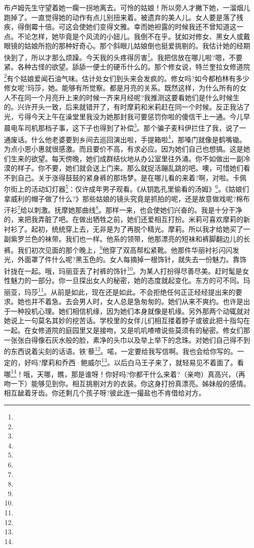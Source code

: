 \par 布卢姆先生守望着她一瘸一拐地离去。可怜的姑娘！所以旁人才撇下她，一溜烟儿跑掉了。一直觉得她的动作有点儿别扭来着。被遗弃的美人儿。女人要是落了残疾，得倒霉十倍。可这会使她们变得文雅。幸而她袒露的时候我还不曾知道这一点。不论怎样，她毕竟是个风流的小妞儿。我倒不在乎。犹如对修女、黑女人或戴眼镜的姑娘所抱的那种好奇心。那个斜眼儿姑娘倒也挺爱挑剔的。我估计她的经期快到了，所以才那么烦躁。今天我的头疼得厉害\footnote{}。我把信放在哪儿啦?嗯，不要紧。各种古怪的欲望。舔舔一便士的硬币什么的。那个修女说，特兰奎拉女修道院\footnote{}有个姑娘爱闻石油气味。估计处女们到头来会发疯的。修女吗?如今都柏林有多少修女呢?玛莎，她。能够有所觉察。都是月亮的关系。既然这样，为什么所有的女人不在同一个月亮升上来的时候一齐来月经呢?我推测这要看她们是什么时候生的。兴许开头一致，后来就错开了，有时摩莉和米莉赶在同一个时候。反正我沾了光，亏得今天上午在澡堂里我没为她那封我可要惩罚你啦的傻信干上一通。今儿早晨电车司机那档子事，这下子也得到了补偿\footnote{}。那个骗子麦科伊拦住了我，说了一通废话。什么他老婆要到乡间去巡回演出啦，手提箱啦\footnote{}，那嗓门就像是鹤嘴锄。为点小恩小惠就很感激。而且要价不高，有求必应。因为她们自己也想搞。这是她们生来的欲望。每天傍晚，她们成群结伙地从办公室里往外涌。你不如做出一副冷漠的样子。你不要，她们就会送上门来。那么就捉活蹦乱跳的吧。噢，可惜她们看不到自己。关于涨得鼓鼓的紧身裤的那场梦。是在哪儿看的来着?啊，对啦。卡佩尔街上的活动幻灯器\footnote{}：仅许成年男子观看。《从钥匙孔里偷看的汤姆》\footnote{}。《姑娘们拿威利的帽子做了什么?》那些姑娘的镜头究竟是抓拍的呢，还是故意做戏呢?棉布汗衫\footnote{}给以刺激。抚摩她那曲线\footnote{}。那样一来，也会使她们兴奋的。我是十分干净的，来把我弄脏了吧。在做出牺牲之前，她们还爱相互打扮。米莉可喜欢摩莉的新衬衫了。起初，统统穿上去，无非是为了再脱个精光。摩莉。所以我才给她买了一副紫罗兰色的袜带。我们也一样。他系的领带，他那漂亮的短袜和裤脚翻边儿的长裤。我们初次见面的那个晚上，\footnote{}他穿了双高帮松紧靴。他那件华丽衬衫闪闪发光，外面罩了件什么呢?黑玉色的。女人每摘掉一根饰针，就失去一份魅力。靠饰针拢在一起。哦，玛丽亚丢了衬裤的饰针\footnote{}。为某人打扮得尽善尽美。赶时髦是女性魅力的一部分。你一旦探出女人的秘密，她的态度就起变化。东方的可不同。玛丽亚，玛莎\footnote{}。从前是如此，现在还是如此。不会拒绝任何正正经经提出来的要求。她也并不着急。去会男人时，女人总是急匆匆的。她们从来不爽约。也许是出于一种投机心理。她们相信机缘，因为她们本身就像是机缘。另外那两个动辄就对她说上一句莫名其妙的挖苦话。学校里的女伴儿们相互搂着脖子或彼此把十指勾在一起。在女修道院的庭园里又是接吻，又是叽叽喳喳说些莫须有的秘密。修女们那一张张白得像石灰水般的脸，素净的头巾以及举上举下的念珠。对她们自己得不到的东西说着尖刻的话语。铁'藜\footnote{}。喏，一定要给我写信啊。我也会给你写的。一定的，好吗?摩莉和乔西·鲍威尔\footnote{}。以后白马王子来了，就轻易见不着面了。看哪\footnote{}！哦，天哪，瞧，那是谁呀！你好吗?你都干什么来着?（亲吻）真高兴，（再吻一下）能够见到你。相互挑剔对方的衣装。你这身打扮真漂亮。姊妹般的感情。相互龇着牙齿。你还剩几个孩子呀?彼此连一撮盐也不肯借给对方。
